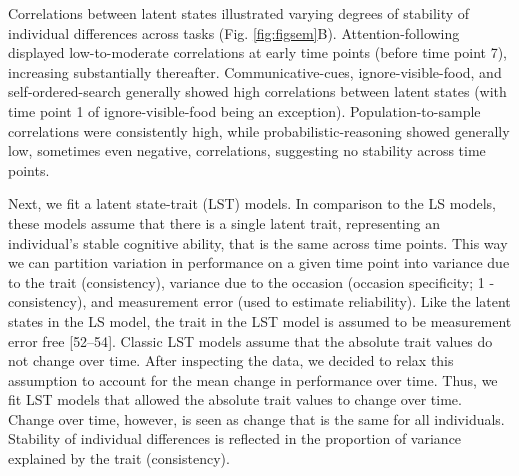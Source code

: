 \documentclass[
  man,floatsintext]{apa6}
\begin{document}
Correlations between latent states illustrated varying degrees of stability of individual differences across tasks (Fig. \ref{fig:figsem}B). Attention-following displayed low-to-moderate correlations at early time points (before time point 7), increasing substantially thereafter. Communicative-cues, ignore-visible-food, and self-ordered-search generally showed high correlations between latent states (with time point 1 of ignore-visible-food being an exception). Population-to-sample correlations were consistently high, while probabilistic-reasoning showed generally low, sometimes even negative, correlations, suggesting no stability across time points.

Next, we fit a latent state-trait (LST) models. In comparison to the LS models, these models assume that there is a single latent trait, representing an individual's stable cognitive ability, that is the same across time points. This way we can partition variation in performance on a given time point into variance due to the trait (consistency), variance due to the occasion (occasion specificity; 1 - consistency), and measurement error (used to estimate reliability). Like the latent states in the LS model, the trait in the LST model is assumed to be measurement error free {[}52--54{]}. Classic LST models assume that the absolute trait values do not change over time. After inspecting the data, we decided to relax this assumption to account for the mean change in performance over time. Thus, we fit LST models that allowed the absolute trait values to change over time. Change over time, however, is seen as change that is the same for all individuals. Stability of individual differences is reflected in the proportion of variance explained by the trait (consistency).
\end{document}
